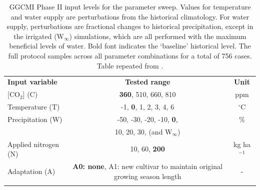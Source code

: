 \documentclass[gmdd]{copernicus} %
\begin{document}
\begin{table}[ht]
    \caption{
    GGCMI Phase II input levels for the parameter sweep. 
    Values for temperature and water supply are perturbations from the historical climatology. 
    For water supply, perturbations are fractional changes to historical precipitation, except in the irrigated (W$_{\infty}$) simulations, which are all performed with the maximum beneficial levels of water. 
    Bold font indicates the `baseline' historical level. 
    The full protocol samples across all parameter combinations for a total of 756 cases.
    Table repeated from \citet{franke2019ctwnexperiment}.
    }
    \label{table:inputs} 
    \begin{tabular}{lcc} 
        \tophline \vspace{1mm}
        \textbf{Input variable} & \textbf{Tested range} & \textbf{Unit} \\ \middlehline \vspace{1mm}
        [CO$_2$] (C) & \textbf{360}, 510, 660, 810 & ppm\\ \middlehline \vspace{1mm}
        Temperature (T) & -1, \textbf{0}, 1, 2, 3, 4, 6 & $^{\circ}$C\\ \middlehline \vspace{1mm}
        Precipitation (W) & -50, -30, -20, -10, \textbf{0}, & \% \\
        {} & 10, 20, 30, (and W$_{\infty}$) & {} \\ \middlehline \vspace{1mm}
        Applied nitrogen (N) & 10, 60, \textbf{200} & kg ha$^{-1}$ \\ \middlehline \vspace{1mm}
        Adaptation (A) & \textbf{A0: none}, A1: new cultivar to maintain original growing season length & -\\ \bottomhline
    \end{tabular}\\
\end{table}
\end{document}
